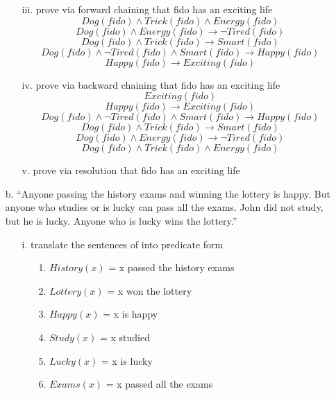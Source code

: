 \documentclass[11pt]{article}
\begin{document}
\begin{flushleft}
\begin{enumerate}
\begin{enumerate}
            \item[iii.] prove via forward chaining that fido has an exciting life
                $$ Dog(fido) \wedge Trick(fido) \wedge Energy(fido) $$
                $$ Dog(fido) \wedge Energy(fido) \rightarrow \neg Tired(fido) $$
                $$ Dog(fido) \wedge Trick(fido) \rightarrow Smart(fido) $$
                $$ Dog(fido) \wedge \neg Tired(fido) \wedge Smart(fido) \rightarrow
                    Happy(fido) $$
                $$ Happy(fido) \rightarrow Exciting(fido) $$

            \item[iv.] prove via backward chaining that fido has an exciting life
                $$ Exciting(fido) $$
                $$ Happy(fido) \rightarrow Exciting(fido) $$
                $$ Dog(fido) \wedge \neg Tired(fido) \wedge Smart(fido) \rightarrow
                    Happy(fido) $$
                $$ Dog(fido) \wedge Trick(fido) \rightarrow Smart(fido) $$
                $$ Dog(fido) \wedge Energy(fido) \rightarrow \neg Tired(fido) $$
                $$ Dog(fido) \wedge Trick(fido) \wedge Energy(fido) $$

            \item[v.] prove via resolution that fido has an exciting life
        \end{enumerate}

    \item[b.] “Anyone passing the history exams and winning the lottery is
        happy.  But anyone who studies or is lucky can pass all the exams.
        John did not study, but he is lucky.  Anyone who is lucky wins the
        lottery.”  

        \begin{enumerate}
            \item[i.] translate the sentences of into predicate form
                \begin{enumerate}
                    \item[1.] $History(x)$ = x passed the history exams
                    \item[2.] $Lottery(x)$ = x won the lottery
                    \item[3.] $Happy(x)$ = x is happy
                    \item[4.] $Study(x)$ = x studied
                    \item[5.] $Lucky(x)$ = x is lucky
                    \item[6.] $Exams(x)$ = x passed all the exams
                \end{enumerate}


\end{enumerate}
\end{enumerate}
\end{flushleft}
\end{document}
